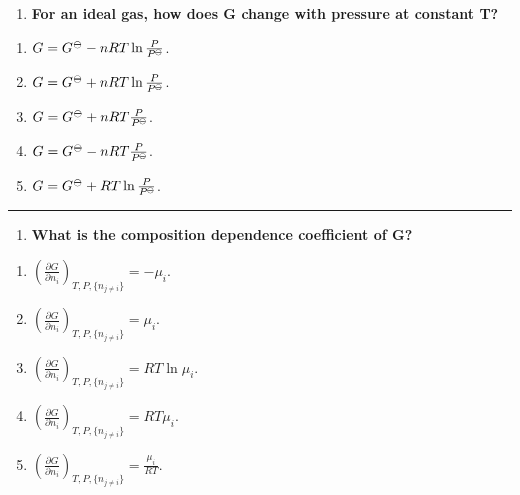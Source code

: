 \documentclass[
  9pt,
]{extbook}
\providecommand{\tightlist}{%
  \setlength{\itemsep}{0pt}\setlength{\parskip}{0pt}}
\theoremstyle{definition}
\theoremstyle{definition}
\theoremstyle{definition}
\theoremstyle{definition}
\theoremstyle{remark}
\begin{document}
\begin{enumerate}
\def\labelenumi{\arabic{enumi}.}
\setcounter{enumi}{5}
\tightlist
\item
  \textbf{For an ideal gas, how does G change with pressure at constant T?}
\end{enumerate}

\begin{enumerate}
\def\labelenumi{\alph{enumi}.}
\tightlist
\item
  \(G = G^{{-\kern-6pt{\ominus}\kern-6pt-}} - nRT\ln\frac{P}{P^{{-\kern-6pt{\ominus}\kern-6pt-}}}\).
\item
  \(G = G^{{-\kern-6pt{\ominus}\kern-6pt-}} + nRT\ln\frac{P}{P^{{-\kern-6pt{\ominus}\kern-6pt-}}}\).
\item
  \(G = G^{{-\kern-6pt{\ominus}\kern-6pt-}} + nRT\frac{P}{P^{{-\kern-6pt{\ominus}\kern-6pt-}}}\).
\item
  \(G = G^{{-\kern-6pt{\ominus}\kern-6pt-}} - nRT\frac{P}{P^{{-\kern-6pt{\ominus}\kern-6pt-}}}\).
\item
  \(G = G^{{-\kern-6pt{\ominus}\kern-6pt-}} + RT\ln\frac{P}{P^{{-\kern-6pt{\ominus}\kern-6pt-}}}\).
\end{enumerate}

\begin{center}\rule{0.5\linewidth}{0.5pt}\end{center}

\begin{enumerate}
\def\labelenumi{\arabic{enumi}.}
\setcounter{enumi}{6}
\tightlist
\item
  \textbf{What is the composition dependence coefficient of G?}
\end{enumerate}

\begin{enumerate}
\def\labelenumi{\alph{enumi}.}
\tightlist
\item
  \(\left(\frac{\partial G}{\partial n_i}\right)_{T,P,\{n_{j\neq i}\}} = -\mu_i\).
\item
  \(\left(\frac{\partial G}{\partial n_i}\right)_{T,P,\{n_{j\neq i}\}} = \mu_i\).
\item
  \(\left(\frac{\partial G}{\partial n_i}\right)_{T,P,\{n_{j\neq i}\}} = RT\ln\mu_i\).
\item
  \(\left(\frac{\partial G}{\partial n_i}\right)_{T,P,\{n_{j\neq i}\}} = RT\mu_i\).
\item
  \(\left(\frac{\partial G}{\partial n_i}\right)_{T,P,\{n_{j\neq i}\}} = \frac{\mu_i}{RT}\).
\end{enumerate}
\end{document}
